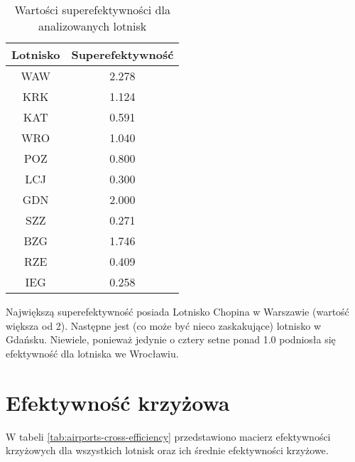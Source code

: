 \documentclass[a4paper,12pt]{article}
\begin{document}
\begin{table}[H]
    \centering
    \begin{tabular}{c|c}
    \hline
         Lotnisko & Superefektywność  \\ \hline
         WAW & 2.278 \\
         KRK & 1.124 \\
         KAT & 0.591 \\
         WRO & 1.040 \\
         POZ & 0.800 \\
         LCJ & 0.300 \\
         GDN & 2.000 \\
         SZZ & 0.271 \\
         BZG & 1.746 \\
         RZE & 0.409 \\
         IEG & 0.258 \\
    \hline
    \end{tabular}
    \caption{Wartości superefektywności dla analizowanych lotnisk}
    \label{tab:airports-super-efficiency}
\end{table}

\noindent Największą superefektywność posiada Lotnisko Chopina w Warszawie (wartość większa od 2). Następne jest (co może być nieco zaskakujące) lotnisko w Gdańsku. Niewiele, ponieważ jedynie o cztery setne ponad 1.0 podniosła się efektywność dla lotniska we Wrocławiu.

\section{Efektywność krzyżowa}

W tabeli \ref{tab:airports-cross-efficiency} przedstawiono macierz efektywności krzyżowych dla wszystkich lotnisk oraz ich średnie efektywności krzyżowe. 
\end{document}
